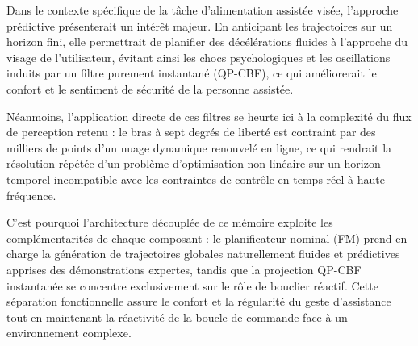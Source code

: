 Dans le contexte spécifique de la tâche d'alimentation assistée visée, l'approche prédictive présenterait un intérêt majeur. En anticipant les trajectoires sur un horizon fini, elle permettrait de planifier des décélérations fluides à l'approche du visage de l'utilisateur, évitant ainsi les chocs psychologiques et les oscillations induits par un filtre purement instantané (\ac{QP}-\ac{CBF}), ce qui améliorerait le confort et le sentiment de sécurité de la personne assistée.

Néanmoins, l'application directe de ces filtres se heurte ici à la complexité du flux de perception retenu : le bras à sept degrés de liberté est contraint par des milliers de points d'un nuage dynamique renouvelé en ligne, ce qui rendrait la résolution répétée d'un problème d'optimisation non linéaire sur un horizon temporel incompatible avec les contraintes de contrôle en temps réel à haute fréquence.

C'est pourquoi l'architecture découplée de ce mémoire exploite les complémentarités de chaque composant : le planificateur nominal (\ac{FM}) prend en charge la génération de trajectoires globales naturellement fluides et prédictives apprises des démonstrations expertes, tandis que la projection \ac{QP}-\ac{CBF} instantanée se concentre exclusivement sur le rôle de bouclier réactif. Cette séparation fonctionnelle assure le confort et la régularité du geste d'assistance tout en maintenant la réactivité de la boucle de commande face à un environnement complexe.


